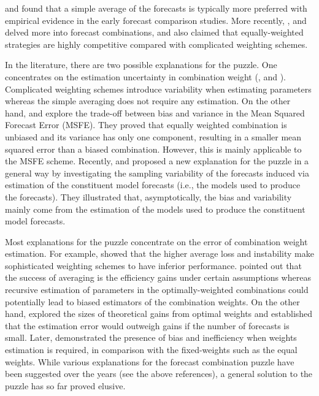 \documentclass{monashthesis}
\begin{document}
\textcite{MACF82} and \textcite{SW98} found that a simple average of the forecasts is typically more preferred with empirical evidence in the early forecast comparison studies. More recently, \textcite{SW04}, \textcite{MSA18} and \textcite{MSA20} delved more into forecast combinations, and also claimed that equally-weighted strategies are highly competitive compared with complicated weighting schemes.

In the literature, there are two possible explanations for the puzzle. One concentrates on the estimation uncertainty in combination weight (\textcite{SW98}, \textcite{SW04} and \textcite{SW09}). Complicated weighting schemes introduce variability when estimating parameters whereas the simple averaging does not require any estimation. On the other hand, \textcite{E11} and \textcite{CMVW16} explore the trade-off between bias and variance in the Mean Squared Forecast Error (MSFE). They proved that equally weighted combination is unbiased and its variance has only one component, resulting in a smaller mean squared error than a biased combination. However, this is mainly applicable to the MSFE scheme. Recently, \textcite{ZMFP22} and \textcite{FZMP23} proposed a new explanation for the puzzle in a general way by investigating the sampling variability of the forecasts induced via estimation of the constituent model forecasts (i.e., the models used to produce the forecasts). They illustrated that, asymptotically, the bias and variability mainly come from the estimation of the models used to produce the constituent model forecasts.

Most explanations for the puzzle concentrate on the error of combination weight estimation. For example, \textcite{SW04} showed that the higher average loss and instability make sophisticated weighting schemes to have inferior performance. \textcite{T06} pointed out that the success of averaging is the efficiency gains under certain assumptions whereas recursive estimation of parameters in the optimally-weighted combinations could potentially lead to biased estimators of the combination weights. On the other hand, \textcite{E11} explored the sizes of theoretical gains from optimal weights and established that the estimation error would outweigh gains if the number of forecasts is small. Later, \textcite{CMVW16} demonstrated the presence of bias and inefficiency when weights estimation is required, in comparison with the fixed-weights such as the equal weights. While various explanations for the forecast combination puzzle have been suggested over the years (see the above references), a general solution to the puzzle has so far proved elusive.
\end{document}
